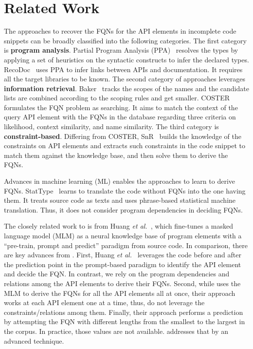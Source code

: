 \section{Related Work}
\label{sec:related}

The approaches to recover the FQNs for the API elements in incomplete
code snippets can be broadly classified into the following categories.
The first category is {\bf program analysis}. Partial Program Analysis
(PPA)~\cite{dagenais-oopsla08} resolves the types by applying a set of
heuristics on the syntactic constructs to infer the declared
types. RecoDoc~\cite{dagenais-icse12} uses PPA to infer links between
APIs and documentation. It requires all the target libraries to be
known. The second category of approaches leverages {\bf
  information retrieval}. Baker~\cite{liveapi14} tracks the scopes of
the names and the candidate lists are combined according to the
scoping rules and get smaller. COSTER~\cite{coster-ase19} formulates
the FQN problem as searching. It aims to match the context of the
query API element with the FQNs in the database regarding three
criteria on likelihood, context similarity, and name similarity.  The
third category is {\bf constraint-based}. Differing from COSTER,
SnR~\cite{snr-icse22} builds the knowledge of the constraints on API
elements and extracts such constraints in the code snippet to match
them against the knowledge base, and then solve them to derive the
FQNs.

Advances in machine learning (ML) enables the approaches to learn to
derive FQNs. StatType~\cite{icse18} learns to translate the code
without FQNs into the one having them. It treats source code as texts
and uses phrase-based statistical machine translation. Thus, it does
not consider program dependencies in deciding FQNs.

The closely related work to {\tool} is from Huang {\em et
  al.}~\cite{prompt-ase22}, which fine-tunes a masked language model
(MLM) as a neural knowledge base of program elements with a
``pre-train, prompt and predict'' paradigm from source code. In
comparison, there are key advances from {\tool}. First, Huang {\em et
  al.}~\cite{prompt-ase22} leverages the code before and after the
prediction point in the prompt-based paradigm to identify the API
element and decide the FQN. In contrast, we rely on the program
dependencies and relations among the API elements to derive their
FQNs. Second, while {\tool} uses the MLM to derive the FQNs for all
the API elements all at once, their approach works at each API element
one at a time, thus, do not leverage the constraints/relations among
them. Finally, their approach performs a prediction by attempting the
FQN with different lengths from the smallest to the largest in the
corpus. In practice, those values are not available. {\tool}
addresses that by an advanced technique.



